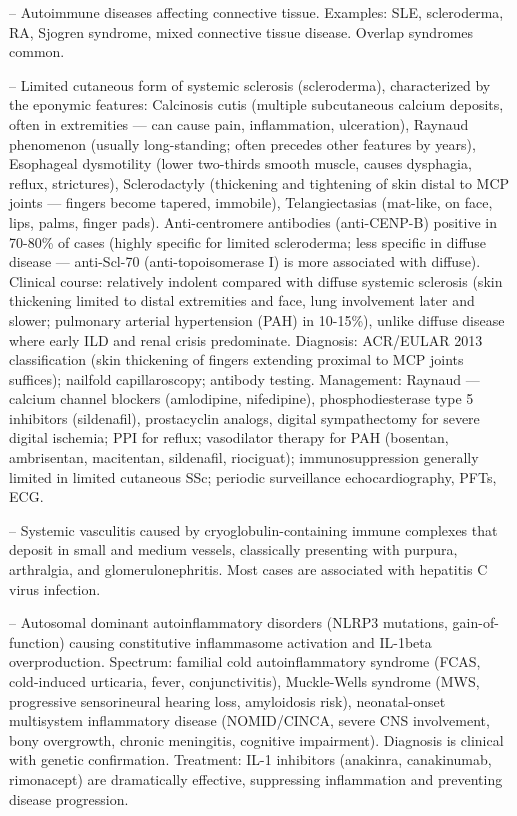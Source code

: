 -- Autoimmune diseases affecting connective tissue. Examples: SLE, scleroderma, RA, Sjogren syndrome, mixed connective tissue disease. Overlap syndromes common.

-- Limited cutaneous form of systemic sclerosis (scleroderma), characterized by the eponymic features: Calcinosis cutis (multiple subcutaneous calcium deposits, often in extremities — can cause pain, inflammation, ulceration), Raynaud phenomenon (usually long-standing; often precedes other features by years), Esophageal dysmotility (lower two-thirds smooth muscle, causes dysphagia, reflux, strictures), Sclerodactyly (thickening and tightening of skin distal to MCP joints — fingers become tapered, immobile), Telangiectasias (mat-like, on face, lips, palms, finger pads). Anti-centromere antibodies (anti-CENP-B) positive in 70-80\% of cases (highly specific for limited scleroderma; less specific in diffuse disease — anti-Scl-70 (anti-topoisomerase I) is more associated with diffuse). Clinical course: relatively indolent compared with diffuse systemic sclerosis (skin thickening limited to distal extremities and face, lung involvement later and slower; pulmonary arterial hypertension (PAH) in 10-15\%), unlike diffuse disease where early ILD and renal crisis predominate. Diagnosis: ACR/EULAR 2013 classification (skin thickening of fingers extending proximal to MCP joints suffices); nailfold capillaroscopy; antibody testing. Management: Raynaud — calcium channel blockers (amlodipine, nifedipine), phosphodiesterase type 5 inhibitors (sildenafil), prostacyclin analogs, digital sympathectomy for severe digital ischemia; PPI for reflux; vasodilator therapy for PAH (bosentan, ambrisentan, macitentan, sildenafil, riociguat); immunosuppression generally limited in limited cutaneous SSc; periodic surveillance echocardiography, PFTs, ECG.

-- Systemic vasculitis caused by cryoglobulin-containing immune complexes that deposit in small and medium vessels, classically presenting with purpura, arthralgia, and glomerulonephritis. Most cases are associated with hepatitis C virus infection.

-- Autosomal dominant autoinflammatory disorders (NLRP3 mutations, gain-of-function) causing constitutive inflammasome activation and IL-1beta overproduction. Spectrum: familial cold autoinflammatory syndrome (FCAS, cold-induced urticaria, fever, conjunctivitis), Muckle-Wells syndrome (MWS, progressive sensorineural hearing loss, amyloidosis risk), neonatal-onset multisystem inflammatory disease (NOMID/CINCA, severe CNS involvement, bony overgrowth, chronic meningitis, cognitive impairment). Diagnosis is clinical with genetic confirmation. Treatment: IL-1 inhibitors (anakinra, canakinumab, rimonacept) are dramatically effective, suppressing inflammation and preventing disease progression.


